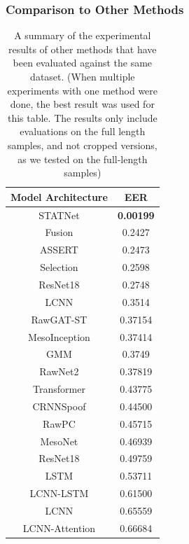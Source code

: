 \documentclass{article}
\begin{document}
		\subsubsection{Comparison to Other Methods}
			\begin{table}
				\caption{A summary of the experimental results of other methods that have been
				evaluated against the same dataset. (When multiple experiments with one method
				were done, the best result was used for this table. The results only include
				evaluations on the full length samples, and not cropped versions, as we tested on
				the full-length samples)}
				\vspace{10pt}
				\centering
				\begin{tabular}{c | c}
					\hline
					Model Architecture & EER \\
					\hline
					STATNet \cite{ranjan_statnet_2022} & \textbf{0.00199} \\
					Fusion \cite{yang_robust_2024} & 0.2427 \\
					ASSERT \cite{yi_audio_2023} & 0.2473 \\
					Selection \cite{yang_robust_2024} & 0.2598 \\
					ResNet18 \cite{yang_robust_2024} & 0.2748 \\
					LCNN \cite{yi_audio_2023} & 0.3514 \\
					RawGAT-ST \cite{muller_does_2022} & 0.37154 \\
					MesoInception \cite{muller_does_2022} & 0.37414 \\
					GMM \cite{yi_audio_2023} & 0.3749 \\
					RawNet2 \cite{muller_does_2022} & 0.37819 \\
					Transformer \cite{muller_does_2022} & 0.43775 \\
					CRNNSpoof \cite{muller_does_2022} & 0.44500 \\
					RawPC \cite{muller_does_2022} & 0.45715 \\
					MesoNet \cite{muller_does_2022} & 0.46939 \\
					ResNet18 \cite{muller_does_2022} & 0.49759 \\
					LSTM \cite{muller_does_2022} & 0.53711 \\
					LCNN-LSTM \cite{muller_does_2022} & 0.61500 \\
					LCNN \cite{muller_does_2022} & 0.65559 \\
					LCNN-Attention \cite{muller_does_2022} & 0.66684 \\
				\end{tabular}
				\label{table:other_results}
			\end{table}
\end{document}
